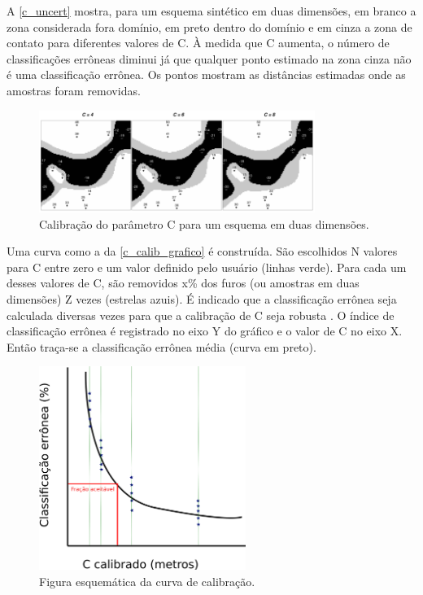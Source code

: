 A \autoref{c_uncert} mostra, para um esquema sintético em duas dimensões, em branco a zona considerada fora domínio, em preto dentro do domínio e em cinza a zona de contato para diferentes valores de C. À medida que C aumenta, o número de classificações errôneas diminui já que qualquer ponto estimado na zona cinza não é uma classificação errônea. Os pontos mostram as distâncias estimadas onde as amostras foram removidas. 

\begin{figure}[H]
	\caption{\label{c_uncert}Calibração do parâmetro C para um esquema em duas dimensões.}
	\centering
		\includegraphics[width=0.8\textwidth]{capitulo_2/imagens/c_uncert.png}
\end{figure}

Uma curva como a da \autoref{c_calib_grafico} é construída. São escolhidos N valores para C entre zero e um valor definido pelo usuário (linhas verde). Para cada um desses valores de C, são removidos x\% dos furos (ou amostras em duas dimensões) Z vezes (estrelas azuis). É indicado que a classificação errônea seja calculada diversas vezes para que a calibração de C seja robusta \cite{wilde2012kriging}. O índice de classificação errônea é registrado no eixo Y do gráfico e o valor de C no eixo X. Então traça-se a classificação errônea média (curva em preto).

\begin{figure}[H]
	\caption{\label{c_calib_grafico}Figura esquemática da curva de calibração.}
	\centering
		\includegraphics[width=0.6\textwidth]{capitulo_2/imagens/calibration.png}
\end{figure}

